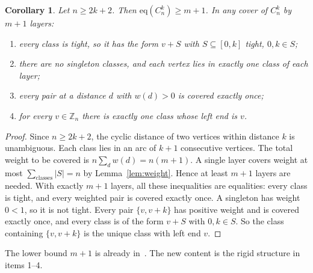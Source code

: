 \documentclass[11pt]{article}
\newtheorem{corollary}[theorem]{Corollary}
\theoremstyle{remark}
\begin{document}
\begin{corollary}\label{cor:structure}
Let $n\ge 2k+2$. Then $\mathrm{eq}(C_n^k)\ge m+1$. In any cover of $C_n^k$ by $m+1$ layers:
\begin{enumerate}
\item every class is tight, so it has the form $v+S$ with $S\subseteq[0,k]$ tight, $0,k\in S$;
\item there are no singleton classes, and each vertex lies in exactly one class of each layer;
\item every pair at a distance $d$ with $w(d)>0$ is covered exactly once;
\item for every $v\in\mathbb Z_n$ there is exactly one class whose left end is $v$.
\end{enumerate}
\end{corollary}
\begin{proof}
Since $n\ge 2k+2$, the cyclic distance of two vertices within distance $k$ is unambiguous. Each class lies in an arc of $k+1$ consecutive vertices. The total weight to be covered is $n\sum_d w(d)=n(m+1)$. A single layer covers weight at most $\sum_{\text{classes}}|S|=n$ by Lemma~\ref{lem:weight}. Hence at least $m+1$ layers are needed. With exactly $m+1$ layers, all these inequalities are equalities: every class is tight, and every weighted pair is covered exactly once. A singleton has weight $0<1$, so it is not tight. Every pair $\{v,v+k\}$ has positive weight and is covered exactly once, and every class is of the form $v+S$ with $0,k\in S$. So the class containing $\{v,v+k\}$ is the unique class with left end $v$.
\end{proof}
The lower bound $m+1$ is already in~\cite{yang}. The new content is the rigid structure in items 1--4.
\end{document}
